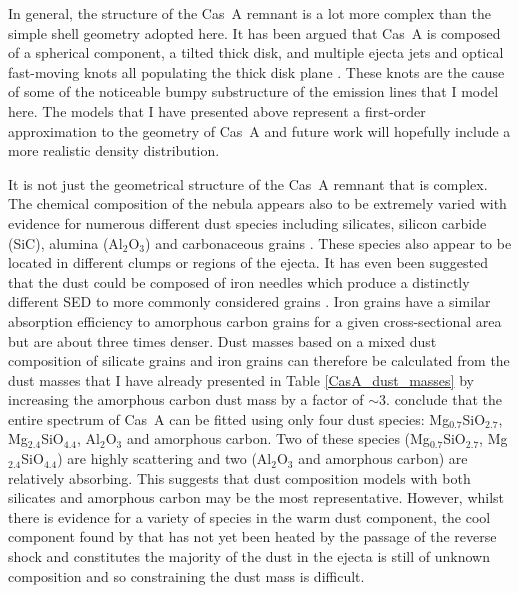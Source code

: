 In general, the structure of the Cas~A remnant is a lot more complex than the simple shell geometry adopted here.  It has been argued that Cas~A is composed of a spherical component, a tilted thick disk, and multiple ejecta jets and optical fast-moving knots all populating the thick disk plane \citep{DeLaney2010}.  These knots  are the cause of some of the noticeable bumpy substructure of the emission lines that I model here.  The models that I have presented above represent a first-order approximation to the geometry of Cas~A and future work will hopefully include a more realistic density distribution.

It is not just the geometrical structure of the Cas~A remnant that is complex.  The chemical composition of the nebula appears also to be extremely varied with evidence for numerous different dust species including silicates, silicon carbide (SiC), alumina (Al$_2$O$_3$) and carbonaceous grains \citep{Rho2008,Arendt2014,Biscaro2014}.  These species also appear to be located in different clumps or regions of the ejecta.  It has even been suggested that the dust could be composed of iron needles which produce a distinctly different SED to more commonly considered grains \citep{Dwek2004}.  Iron grains have a similar absorption efficiency to amorphous carbon grains for a given cross-sectional area but are about three times denser.  Dust masses based on a mixed dust composition of silicate grains and iron grains can therefore be calculated from the dust masses that I have already presented in Table \ref{CasA_dust_masses} by increasing the amorphous carbon dust mass by a factor of $\sim3$.  \citet{Arendt2014} conclude that the entire spectrum of Cas~A can be fitted using only four dust species: Mg$_{0.7}$SiO$_{2.7}$, Mg$_2.4$SiO$_4.4$, Al$_2$O$_3$ and amorphous carbon.  Two of these species (Mg$_{0.7}$SiO$_{2.7}$, Mg$_2.4$SiO$_4.4$) are highly scattering and two (Al$_2$O$_3$ and amorphous carbon) are relatively absorbing.  This  suggests that dust composition models with both silicates and amorphous carbon may be the most representative.  However, whilst there is evidence for a variety of species in the warm dust component, the cool component found by \citet{Barlow2010} that has not yet been heated by the passage of the reverse shock and constitutes the majority of the dust in the ejecta is still of unknown composition \citep{Arendt2014} and so constraining the dust mass is difficult.

